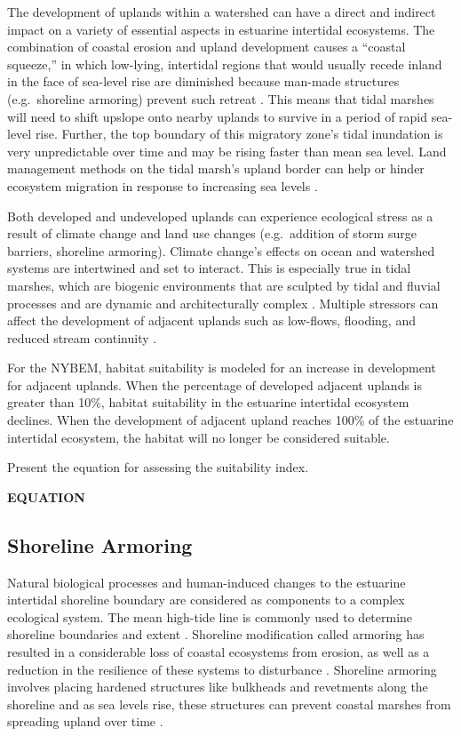 \documentclass[
]{book}
\begin{document}
The development of uplands within a watershed can have a direct and indirect impact on a variety of essential aspects in estuarine intertidal ecosystems. The combination of coastal erosion and upland development causes a ``coastal squeeze,'' in which low-lying, intertidal regions that would usually recede inland in the face of sea-level rise are diminished because man-made structures (e.g.~shoreline armoring) prevent such retreat \citep{prosser_impacts_2018}. This means that tidal marshes will need to shift upslope onto nearby uplands to survive in a period of rapid sea-level rise. Further, the top boundary of this migratory zone's tidal inundation is very unpredictable over time and may be rising faster than mean sea level. Land management methods on the tidal marsh's upland border can help or hinder ecosystem migration in response to increasing sea levels \citep{anisfeld_upslope_2017}.

Both developed and undeveloped uplands can experience ecological stress as a result of climate change and land use changes (e.g.~addition of storm surge barriers, shoreline armoring). Climate change's effects on ocean and watershed systems are intertwined and set to interact. This is especially true in tidal marshes, which are biogenic environments that are sculpted by tidal and fluvial processes and are dynamic and architecturally complex \citep{colombano_climate_2021}. Multiple stressors can affect the development of adjacent uplands such as low-flows, flooding, and reduced stream continuity \citep{talke_changing_2020}.

For the NYBEM, habitat suitability is modeled for an increase in development for adjacent uplands. When the percentage of developed adjacent uplands is greater than 10\%, habitat suitability in the estuarine intertidal ecosystem declines. When the development of adjacent upland reaches 100\% of the estuarine intertidal ecosystem, the habitat will no longer be considered suitable.

Present the equation for assessing the suitability index.

\textbf{EQUATION}

\hypertarget{shoreline-armoring}{%
\subsection{Shoreline Armoring}\label{shoreline-armoring}}

Natural biological processes and human-induced changes to the estuarine intertidal shoreline boundary are considered as components to a complex ecological system. The mean high-tide line is commonly used to determine shoreline boundaries and extent \citep{kittinger_shoreline_2010}. Shoreline modification called armoring has resulted in a considerable loss of coastal ecosystems from erosion, as well as a reduction in the resilience of these systems to disturbance \citep{kittinger_shoreline_2010}. Shoreline armoring involves placing hardened structures like bulkheads and revetments along the shoreline and as sea levels rise, these structures can prevent coastal marshes from spreading upland over time \citep{gardner_is_2021}.
\end{document}
